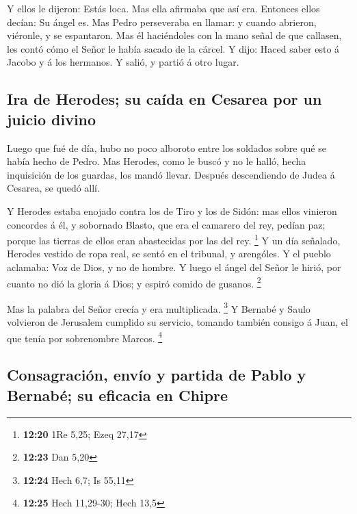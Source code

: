  Y ellos le dijeron: Estás loca. Mas ella afirmaba que así
era. Entonces ellos decían: Su ángel es.  Mas Pedro
perseveraba en llamar: y cuando abrieron, viéronle, y se espantaron.
 Mas él haciéndoles con la mano señal de que callasen, les
contó cómo el Señor le había sacado de la cárcel. Y dijo: Haced saber
esto á Jacobo y á los hermanos. Y salió, y partió á otro lugar.

\hypertarget{ira-de-herodes-su-cauxedda-en-cesarea-por-un-juicio-divino}{%
\subsection{Ira de Herodes; su caída en Cesarea por un juicio
divino}\label{ira-de-herodes-su-cauxedda-en-cesarea-por-un-juicio-divino}}

 Luego que fué de día, hubo no poco alboroto entre los
soldados sobre qué se había hecho de Pedro.  Mas Herodes,
como le buscó y no le halló, hecha inquisición de los guardas, los mandó
llevar. Después descendiendo de Judea á Cesarea, se quedó allí.

 Y Herodes estaba enojado contra los de Tiro y los de
Sidón: mas ellos vinieron concordes á él, y sobornado Blasto, que era el
camarero del rey, pedían paz; porque las tierras de ellos eran
abastecidas por las del rey. \footnote{\textbf{12:20} 1Re 5,25; Ezeq
  27,17}  Y un día señalado, Herodes vestido de ropa real,
se sentó en el tribunal, y arengóles.  Y el pueblo
aclamaba: Voz de Dios, y no de hombre.  Y luego el ángel
del Señor le hirió, por cuanto no dió la gloria á Dios; y espiró comido
de gusanos. \footnote{\textbf{12:23} Dan 5,20}

 Mas la palabra del Señor crecía y era multiplicada.
\footnote{\textbf{12:24} Hech 6,7; Is 55,11}  Y Bernabé y
Saulo volvieron de Jerusalem cumplido su servicio, tomando también
consigo á Juan, el que tenía por sobrenombre Marcos. \footnote{\textbf{12:25}
  Hech 11,29-30; Hech 13,5}

\hypertarget{consagraciuxf3n-envuxedo-y-partida-de-pablo-y-bernabuxe9-su-eficacia-en-chipre}{%
\subsection{Consagración, envío y partida de Pablo y Bernabé; su
eficacia en
Chipre}\label{consagraciuxf3n-envuxedo-y-partida-de-pablo-y-bernabuxe9-su-eficacia-en-chipre}}

